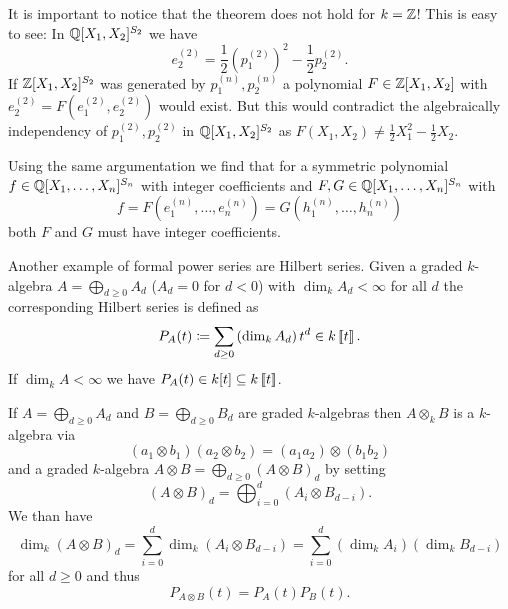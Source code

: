 It is important to notice that the theorem does not hold for $k = \mathbb{Z}$! This is easy to see: In $\mathbb{Q}[X_1, X_2]^{S_2}$ we have
\[
 e^{(2)}_2 = \frac{1}{2}\left(p^{(2)}_1\right)^2 - \frac{1}{2} p^{(2)}_2.
\]
If $\mathbb{Z}[X_1, X_2]^{S_2}$ was generated by $p^{(n)}_1, p^{(n)}_2$ a polynomial $F \in \mathbb{Z}[X_1, X_2]$ with $e^{(2)}_2 = F\left(e^{(2)}_1, e^{(2)}_2\right)$ would exist. But this would contradict the algebraically independency of $p^{(2)}_1, p^{(2)}_2$ in $\mathbb{Q}[X_1, X_2]^{S_2}$ as $F(X_1, X_2) \neq \frac{1}{2} X_1^2 - \frac{1}{2} X_2$.


Using the same argumentation we find that for a symmetric polynomial $f \in \mathbb{Q}[X_1, \dotsc, X_n]^{S_n}$ with integer coefficients and $F,G \in \mathbb{Q}[X_1, \dotsc, X_n]^{S_n}$ with
\[
 f = F\left( e^{(n)}_1, \dotsc, e^{(n)}_n \right) = G\left( h^{(n)}_1, \dotsc, h^{(n)}_n\right)
\]
both $F$ and $G$ must have integer coefficients.


\begin{expl}
 Another example of formal power series are Hilbert series. Given a graded $k$-algebra $A = \bigoplus_{d \geq 0} A_d$ ($A_d = 0$ for $d < 0$) with $\dim_k A_d < \infty$ for all $d$ the corresponding Hilbert series is defined as
 \[
  P_A(t) \coloneqq \sum_{d \geq 0} \left( \dim_k A_d \right) t^d \in k\left[\!\left[t\right]\!\right].
 \]
 If $\dim_k A < \infty$ we have $P_A(t) \in k[t] \subseteq k\left[\!\left[t\right]\!\right]$.
 
 If $A = \bigoplus_{d \geq 0} A_d$ and $B = \bigoplus_{d \geq 0} B_d$ are graded $k$-algebras then $A \otimes_k B$ is a $k$-algebra via
 \[
  (a_1 \otimes b_1) (a_2 \otimes b_2) = (a_1 a_2) \otimes (b_1 b_2)
 \]
 and a graded $k$-algebra $A \otimes B = \bigoplus_{d \geq 0} (A \otimes B)_d$ by setting
 \[
  (A \otimes B)_d = \bigoplus_{i=0}^d (A_i \otimes B_{d-i}).
 \]
 We than have
 \[
  \dim_k (A \otimes B)_d = \sum_{i=0}^d \dim_k (A_i \otimes B_{d-i}) = \sum_{i=0}^d (\dim_k A_i) (\dim_k B_{d-i})
 \]
 for all $d \geq 0$ and thus
 \[
  P_{A \otimes B}(t) = P_A(t) P_B(t).
 \]
\end{expl}



